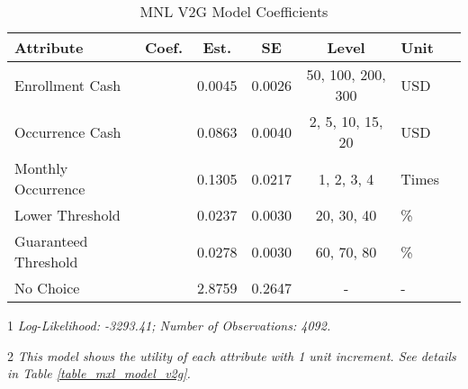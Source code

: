 \begin{table}[H]
\centering
\begin{threeparttable}
\caption{MNL V2G Model Coefficients}
\fontsize{11}{12}\selectfont
\begin{tabular}{l>{\centering\arraybackslash}p{1.5cm}ccc>{\centering\arraybackslash}p{2cm}c}
\toprule
\textbf{Attribute} & \textbf{Coef.} & \textbf{Est.} & \textbf{SE} & \textbf{Level} & \textbf{Unit}\\
\midrule
\multirow{-1}{*}{\raggedright\arraybackslash Enrollment Cash} & \multirow{-1}{1.5cm}{\centering\arraybackslash $\beta_1$} & 0.0045 & 0.0026 & 50, 100, 200, 300 & USD\\
\cmidrule(lr){1-6}
\multirow{-1}{*}{\raggedright\arraybackslash Occurrence Cash} & \multirow{-1}{1.5cm}{\centering\arraybackslash $\beta_2$} & 0.0863 & 0.0040 & 2, 5, 10, 15, 20 & USD\\
\cmidrule(lr){1-6}
\multirow{-1}{*}{\raggedright\arraybackslash Monthly Occurrence} & \multirow{-1}{1.5cm}{\centering\arraybackslash $\beta_3$} & 0.1305 & 0.0217 & 1, 2, 3, 4 & Times\\
\cmidrule(lr){1-6}
\multirow{-1}{*}{\raggedright\arraybackslash Lower Threshold} & \multirow{-1}{1.5cm}{\centering\arraybackslash $\beta_4$} & 0.0237 & 0.0030 & 20, 30, 40 & \%\\
\cmidrule(lr){1-6}
\multirow{-1}{*}{\raggedright\arraybackslash Guaranteed Threshold} & \multirow{-1}{1.5cm}{\centering\arraybackslash $\beta_5$} & 0.0278 & 0.0030 & 60, 70, 80 & \%\\
\cmidrule(lr){1-6}
\multirow{-1}{*}{\raggedright\arraybackslash No Choice} & \multirow{-1}{1.5cm}{\centering\arraybackslash $\beta_6$} & 2.8759 & 0.2647 & - & -\\
\bottomrule
\end{tabular}
\begin{tablenotes}
\small
\item [1] \textit{Log-Likelihood: -3293.41; Number of Observations: 4092.}
\item [2] \textit{This model shows the utility of each attribute with 1 unit increment. See details in Table \ref{table_mxl_model_v2g}.}
\end{tablenotes}
\label{table_mnl_model_v2g}
\end{threeparttable}
\end{table}

